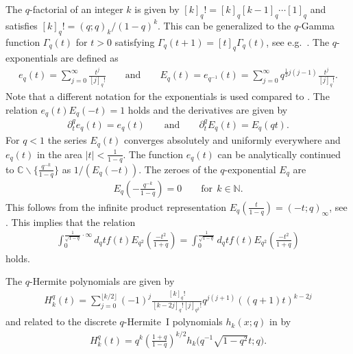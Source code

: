 \documentclass[11pt]{article}
\newcommand{\mC}{\mathbb{C}}
\newcommand{\mN}{\mathbb{N}}
\numberwithin{equation}{section}
\begin{document}
The $q$-factorial of an integer $k$ is given by $[k]_q!=[k]_q[k-1]_q\cdots [1]_q$ and satisf\/ies $[k]_q!=(q;q)_k/(1-q)^k$. This can be generalized to the $q$-Gamma function $\Gamma_q(t)$ for $t>0$ satisfying $\Gamma_q(t+1)=[t]_q\Gamma_q(t)$, see e.g.~\cite[formula (1.10.1)]{MR1052153}. The $q$-exponentials are def\/ined as
\begin{gather*}
e_q(t)=\sum_{j=0}^\infty\frac{t^j}{[j]_q!} \qquad \mbox{and} \qquad E_q(t)=e_{q^{-1}}(t)=\sum_{j=0}^\infty q^{\frac{1}{2}j(j-1)}\frac{t^j}{[j]_q!}.
\end{gather*}
Note that a dif\/ferent notation for the exponentials is used compared to \cite{MR2595267}. The relation $e_q(t)E_q(-t)=1$ holds and the derivatives are given by
\begin{gather}
\label{aflexp}
\partial_t^qe_q(t)=e_q(t) \qquad \mbox{and}\qquad \partial_t^qE_q(t)=E_q(qt).
\end{gather}
For $q<1$ the series $E_q(t)$ converges absolutely and uniformly everywhere and $e_q(t)$ in the area $|t|<\frac{1}{1-q}$. The function $e_q(t)$ can be analytically continued to $\mC\backslash \{\frac{q^{-k}}{1-q}\}$ as $1/(E_q(-t))$. The zeroes of the $q$-exponential $E_q$ are
\begin{gather}
\label{zeroes}
E_{q}\left(-\frac{q^{-k}}{1-q}\right) = 0\qquad \mbox{for} \ \ k\in\mN.
\end{gather}
This follows from the inf\/inite product representation $E_q(\frac{t}{1-q})=(-t;q)_\infty$, see \cite[formula (1.3.16)]{MR1052153}. This implies that the relation
\begin{gather}
\label{intinfeind}
\int_0^{\frac{1}{\sqrt{1-q}}\cdot\infty}d_qt f(t) E_{q^2}\left(\frac{-t^2}{1+q}\right)=\int_0^{\frac{1}{\sqrt{1-q}}}d_qt f(t) E_{q^2}\left(\frac{-t^2}{1+q}\right)
\end{gather}
holds.



The $q$-Hermite polynomials are given by
\begin{gather}
\label{Hermite}
H_k^q(t) = \sum_{j=0}^{\lfloor k/2\rfloor}(-1)^j\frac{[k]_q!}{[k-2j]_q![j]_{q^2}!}q^{j(j+1)}((q+1)t)^{k-2j}
\end{gather}
and related to the discrete $q$-Hermite~I polynomials $h_k(x;q)$ in \cite[Section~3.28]{Koekoek}  by
\begin{gather*}
H_k^q(t) = q^k\left(\frac{1+q}{1-q}\right)^{k/2}h_k\Big(q^{-1}\sqrt{1-q^2}t;q\Big).
\end{gather*}
\end{document}
